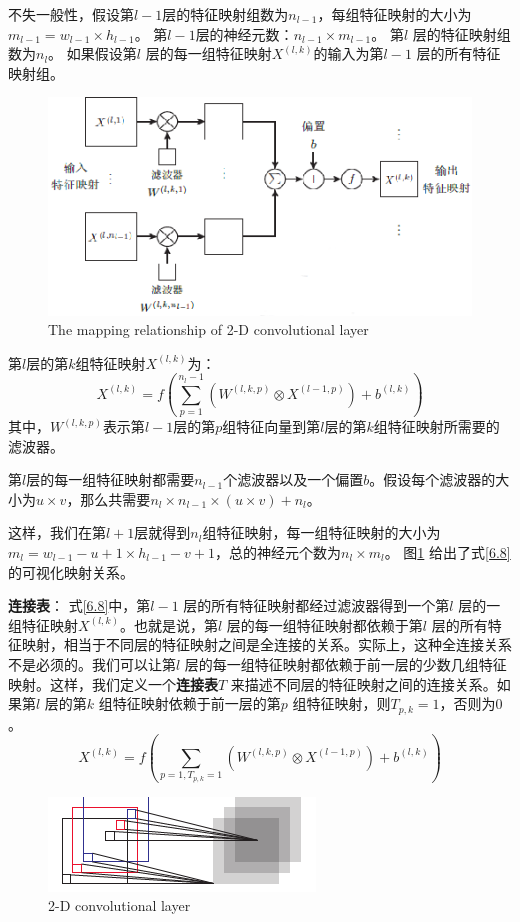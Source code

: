 \documentclass[11pt,fleqn, UTF8]{ctexbook} %
\begin{document}
不失一般性，假设第$l-1$层的特征映射组数为$n_{l-1}$，每组特征映射的大小为$m_{l-1}=w_{l-1}\times h_{l-1}$。 第$l-1$层的神经元数：$n_{l-1}\times m_{l-1}$。 第$l$ 层的特征映射组数为$n_l$。 如果假设第$l$ 层的每一组特征映射$X^{(l,k)}$的输入为第$l-1$ 层的所有特征映射组。

\begin{figure}[t]
 \centering
 \includegraphics{pics/62.png}
 \caption{The mapping relationship of 2-D convolutional layer}
 \label{fig:6.2}
\end{figure}

第$l$层的第$k$组特征映射$X^{(l,k)}$为：
\begin{equation}\label{6.8}
  X^{(l,k)}=f\left( \sum_{p=1}^{n_l-1}(W^{(l,k,p)} \otimes X^{(l-1,p)})+b^{(l,k)} \right)
\end{equation}
其中，$W^{(l,k,p)}$表示第$l-1$层的第$p$组特征向量到第$l$层的第$k$组特征映射所需要的滤波器。

第$l$层的每一组特征映射都需要$n_{l-1}$个滤波器以及一个偏置$b$。假设每个滤波器的大小为$u \times v$，那么共需要$n_l \times n_{l-1} \times (u \times v) + n_l$。

这样，我们在第$l+1$层就得到$n_l$组特征映射，每一组特征映射的大小为$m_l = w_{l-1}-u+1\times h_{l-1}-v +1$，总的神经元个数为$n_l \times m_l$。 图\ref{fig:6.2} 给出了式\ref{6.8}的可视化映射关系。

\textbf{连接表}：  式\ref{6.8}中，第$l-1$ 层的所有特征映射都经过滤波器得到一个第$l$ 层的一组特征映射$X^{(l,k)}$。也就是说，第$l$ 层的每一组特征映射都依赖于第$l$ 层的所有特征映射，相当于不同层的特征映射之间是全连接的关系。实际上，这种全连接关系不是必须的。我们可以让第$l$ 层的每一组特征映射都依赖于前一层的少数几组特征映射。这样，我们定义一个\textbf{连接表}$T$ 来描述不同层的特征映射之间的连接关系。如果第$l$ 层的第$k$ 组特征映射依赖于前一层的第$p$ 组特征映射，则$T_{p,k}=1$，否则为$0$。
\begin{equation}\label{6.9}
  X^{(l,k)}=f\left( \sum_{p=1, T_{p,k}=1}(W^{(l,k,p)} \otimes X^{(l-1,p)})+b^{(l,k)} \right)
\end{equation}
\begin{figure}[t]
 \centering
 \includegraphics{pics/63.png}
 \caption{2-D convolutional layer}
 \label{fig:6.3}
\end{figure}
\end{document}
